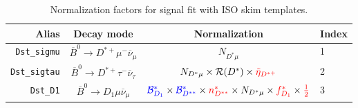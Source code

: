 \begin{landscape}
\begin{table}
\centering
\caption{
    Normalization factors for \Dstar signal fit with ISO skim templates.
}
\label{tab:fit-norm-fact-dst}
\scriptsize

\begin{tabular}{r|c|c|l}
\toprule
        \textbf{Alias} &                                \textbf{Decay mode}                                &                                                                                                                                                                                             \textbf{Normalization}                                                                                                                                                                                              &   \textbf{Index} \\
\midrule
   \texttt{Dst\_sigmu} &           $\overline{B}^0 \rightarrow D^{*+} \mu^- \overline{\nu}_\mu$            &                                                                                                                                                                                                  $N_{D^* \mu}$                                                                                                                                                                                                  &                1 \\
  \texttt{Dst\_sigtau} &          $\overline{B}^0 \rightarrow D^{*+} \tau^- \overline{\nu}_\tau$           &                                                                                                                                                               $N_{D^* \mu} \times \mathcal{R}(D^*) \times \textcolor{red}{\tilde{\eta}_{D^{*+}}}$                                                                                                                                                               &                2 \\
      \texttt{Dst\_D1} &              $\overline{B}^0 \rightarrow D_1 \mu \overline{\nu}_\mu$              &                                                                                           $\textcolor{blue}{\mathcal{B}^{*}_{D_1}} \times \textcolor{blue}{\mathcal{B}^*_{D^{**}}} \times \textcolor{red}{n^{*}_{D^{**}}} \times N_{D^* \mu} \times \textcolor{red}{f^{*}_{D_1}} \times \textcolor{red}{\frac{1}{2}}$                                                                                           &                3 \\

\end{tabular}
\end{table}
\end{landscape}
